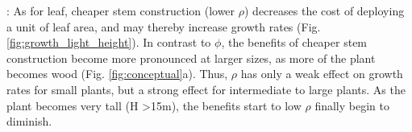 \documentclass[a4paper,11pt]{article}
\begin{document}

:
As for leaf, cheaper stem construction (lower $\rho$) decreases the cost of deploying a unit of leaf area, and may thereby increase growth rates (Fig. \ref{fig:growth_light_height}). In contrast to $\phi$, the benefits of cheaper stem construction become more pronounced at larger sizes, as more of the plant becomes wood (Fig. \ref{fig:conceptual}a). Thus, $\rho$ has only a weak effect on growth rates for small plants, but a strong effect for intermediate to large plants. As the plant becomes very tall (H \textgreater 15m), the benefits start to low $\rho$ finally begin to diminish.
\end{document}
